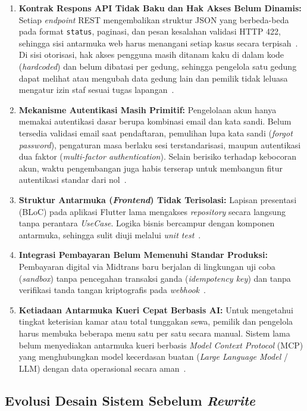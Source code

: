 \begin{enumerate}[label=\arabic*., leftmargin=*]
  \item \textbf{Kontrak Respons API Tidak Baku dan Hak Akses Belum Dinamis:}
    Setiap \textit{endpoint} REST mengembalikan struktur JSON yang berbeda-beda pada format \texttt{status}, paginasi, dan pesan kesalahan validasi HTTP 422, sehingga sisi antarmuka web harus menangani setiap kasus secara terpisah~\cite{microsoft2025}. Di sisi otorisasi, hak akses pengguna masih ditanam kaku di dalam kode (\textit{hardcoded}) dan belum dibatasi per gedung, sehingga pengelola satu gedung dapat melihat atau mengubah data gedung lain dan pemilik tidak leluasa mengatur izin staf sesuai tugas lapangan~\cite{rasyidatur2025,roihanah2025,martin2017}.
  \item \textbf{Mekanisme Autentikasi Masih Primitif:}
    Pengelolaan akun hanya memakai autentikasi dasar berupa kombinasi email dan kata sandi. Belum tersedia validasi email saat pendaftaran, pemulihan lupa kata sandi (\textit{forgot password}), pengaturan masa berlaku sesi terstandarisasi, maupun autentikasi dua faktor (\textit{multi-factor authentication}). Selain berisiko terhadap kebocoran akun, waktu pengembangan juga habis terserap untuk membangun fitur autentikasi standar dari nol~\cite{rasyidatur2025,roihanah2025,sakimura2014}.
  \item \textbf{Struktur Antarmuka (\textit{Frontend}) Tidak Terisolasi:}
    Lapisan presentasi (BLoC) pada aplikasi Flutter lama mengakses \textit{repository} secara langsung tanpa perantara \textit{UseCase}. Logika bisnis bercampur dengan komponen antarmuka, sehingga sulit diuji melalui \textit{unit test}~\cite{martin2017}.
  \item \textbf{Integrasi Pembayaran Belum Memenuhi Standar Produksi:}
    Pembayaran digital via Midtrans baru berjalan di lingkungan uji coba (\textit{sandbox}) tanpa pencegahan transaksi ganda (\textit{idempotency key}) dan tanpa verifikasi tanda tangan kriptografis pada \textit{webhook}~\cite{midtrans2025}.
  \item \textbf{Ketiadaan Antarmuka Kueri Cepat Berbasis AI:}
    Untuk mengetahui tingkat keterisian kamar atau total tunggakan sewa, pemilik dan pengelola harus membuka beberapa menu satu per satu secara manual. Sistem lama belum menyediakan antarmuka kueri berbasis \textit{Model Context Protocol} (MCP) yang menghubungkan model kecerdasan buatan (\textit{Large Language Model} / LLM) dengan data operasional secara aman~\cite{anthropic2024}.
\end{enumerate}

\subsection{Evolusi Desain Sistem Sebelum \textit{Rewrite}}
\label{subsec:evolusi_desain}


